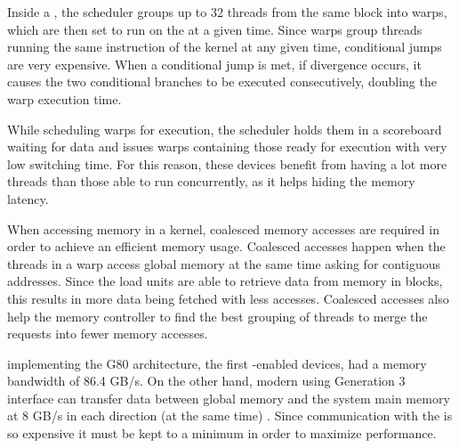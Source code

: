 \documentclass[../thesis]{subfiles}
\begin{document}
	Inside a \sm, the scheduler groups up to 32 threads from the same block into warps, which are then set to run on the \sm at a given time. Since warps group threads running the same instruction of the kernel at any given time, conditional jumps are very expensive. When a conditional jump is met, if divergence occurs, it causes the two conditional branches to be executed consecutively, doubling the warp execution time.

	While scheduling warps for execution, the scheduler holds them in a scoreboard waiting for data and issues warps containing those ready for execution with very low switching time. For this reason, these devices benefit from having a lot more threads than those able to run concurrently, as it helps hiding the memory latency.

	When accessing memory in a \cuda kernel, coalesced memory accesses are required in order to achieve an efficient memory usage. Coalesced accesses happen when the threads in a warp access global memory at the same time asking for contiguous addresses. Since the load units are able to retrieve data from memory in blocks, this results in more data being fetched with less accesses. Coalesced accesses also help the memory controller to find the best grouping of threads to merge the requests into fewer memory accesses.

	\gpus implementing the G80 architecture, the first \cuda-enabled devices, had a memory bandwidth of 86.4 GB/s. On the other hand, modern \gpus using \pcie Generation 3 interface can transfer data between global memory and the system main memory at 8 GB/s in each direction (at the same time) \cite{PMPP:2012}. Since communication with the \cpu is so expensive it must be kept to a minimum in order to maximize performance.

	
\end{document}
